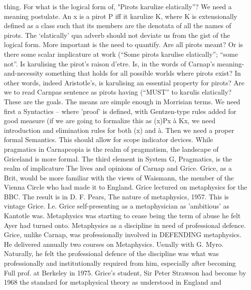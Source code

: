 \documentclass[10pt,titlepage]{book}
\begin{document}
{thing. For what is the logical  form of, "Pirots karulize elatically”? We need 
a meaning postulate. An x is a  pirot P iff it karulize K,  where K is 
extensionally defined as a class such that its members are the  denotata of all 
the names of pirots. The ‘elatically’ qua adverb should not  deviate us 
from the gist of the logical form. More important is the need to  quantify. Are 
all pirots meant? Or is there some scalar implicature at work  (“Some 
pirots karulise elatically”; 
“some not”. Is karulising the pirot’s  raison d’etre. Is, in the words of 
Carnap’s meaning-and-necessity something that  holds for all possible 
worlds where pirots exist? In other words, indeed  Aristotle’s, is karulising an 
essential property for pirots? Are we to read  Carnpas sentence as pirots 
having (“MUST” to karulis elatically? These are the  goals. The means are 
simple enough in Morrisian terms. We need first a   
Syntactics  – where 'proof' is defined, with Gentzen-type rules added for 
good measure (if  we are going to formalize this as (x)Px à  Kx, we need 
introduction and elimination rules for both (x) and à.  Then we need a proper 
formal Semantics. This should allow for scope indicator  devices. While 
pragmatics in Carnapcopia is the realm of pragmatism, the  landscape of Griceland 
is more formal. The third element in System G,  Pragmatics, is the realm of 
implicature 
The  lives and opinions of Carnap and Grice. Grice, as a Brit, would be 
more familiar  with the views of Waismann, the member of the Vienna Circle who 
had made it to  England. Grice lectured on metaphysics for the BBC. The 
result is in D. F.  Pears, The nature of metaphysics, 1957. This is vintage 
Grice. I.e. Grice  self-presenting as a metaphysician as 'ambitious' as Kantotle 
was. Metaphysics  was starting to cease being the term of abuse he felt 
Ayer had turned  onto. 
Metaphysics  as a discipline in need of professional defence. Grice, unlike 
Carnap, was  professionally involved in DEFENDING metaphysics. He delivered 
annually two  courses on Metaphysics. Usually with G. Myro. Naturally, he 
felt the  professional defence of the discipline was what was professionally 
and  institutionally required from him, especially after becoming Full prof. 
at  Berkeley in 1975. Grice's student, Sir Peter Strawson had become by 
1968 the  standard for metaphysical theory as understood in England and 
}
\end{document}
